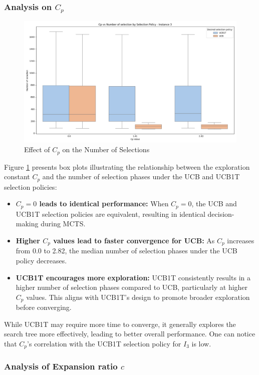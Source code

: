 \subsubsection*{Analysis on $C_p$}

\begin{figure}[!ht]
    \centering
    \includegraphics[width=.4\textwidth]{Figures/3 - cp_vs_selection.png}
    \caption{Effect of \(C_p\) on the Number of Selections}
    \label{fig:cp_vs_selection_3}
\end{figure}

Figure \ref{fig:cp_vs_selection_3} presents box plots illustrating the relationship between the exploration constant \(C_p\) and the number of selection phases under the UCB and UCB1T selection policies:

\begin{itemize}
    \item \textbf{\(C_p = 0\) leads to identical performance:}
          When \(C_p = 0\), the UCB and UCB1T selection policies are equivalent, resulting in identical decision-making during MCTS.
    \item \textbf{Higher \(C_p\) values lead to faster convergence for UCB:}
          As \(C_p\) increases from 0.0 to 2.82, the median number of selection phases under the UCB policy decreases.
    \item \textbf{UCB1T encourages more exploration:}
          UCB1T consistently results in a higher number of selection phases compared to UCB, particularly at higher \(C_p\) values. This aligns with UCB1T's design to promote broader exploration before converging.
\end{itemize}

While UCB1T may require more time to converge, it generally explores the search tree more effectively, leading to better overall performance. One can notice that $C_p$'s correlation with the UCB1T selection policy for $I_3$ is low.

\subsubsection*{Analysis of Expansion ratio $c$}

